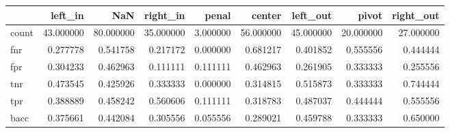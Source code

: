 \begin{tabular}{lrrrrrrrr}
\toprule
{} &    left\_in &        NaN &   right\_in &     penal &     center &   left\_out &      pivot &  right\_out \\
\midrule
count &  43.000000 &  80.000000 &  35.000000 &  3.000000 &  56.000000 &  45.000000 &  20.000000 &  27.000000 \\
fnr   &   0.277778 &   0.541758 &   0.217172 &  0.000000 &   0.681217 &   0.401852 &   0.555556 &   0.444444 \\
fpr   &   0.304233 &   0.462963 &   0.111111 &  0.111111 &   0.462963 &   0.261905 &   0.333333 &   0.255556 \\
tnr   &   0.473545 &   0.425926 &   0.333333 &  0.000000 &   0.314815 &   0.515873 &   0.333333 &   0.744444 \\
tpr   &   0.388889 &   0.458242 &   0.560606 &  0.111111 &   0.318783 &   0.487037 &   0.444444 &   0.555556 \\
bacc  &   0.375661 &   0.442084 &   0.305556 &  0.055556 &   0.289021 &   0.459788 &   0.333333 &   0.650000 \\
\bottomrule
\end{tabular}
